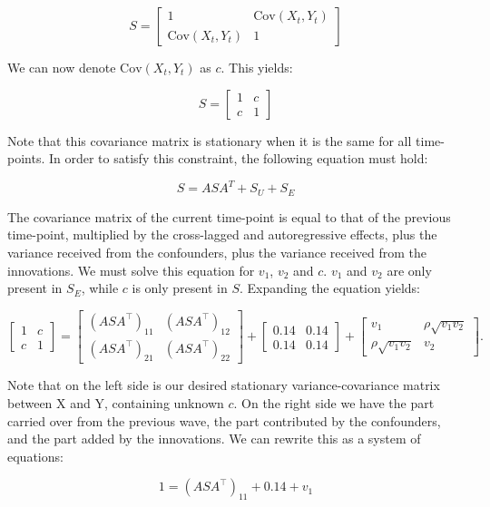\documentclass{article}
\begin{document}
\[
S =
\begin{bmatrix}
1 & \mathrm{Cov}(X_t, Y_t) \\
\mathrm{Cov}(X_t, Y_t) & 1
\end{bmatrix}
\]

\noindent
We can now denote $\mathrm{Cov}(X_t, Y_t)$ as $c$. This yields:

\[
S = \begin{bmatrix} 1 & c \\ c & 1 \end{bmatrix}
\]

\noindent
Note that this covariance matrix is stationary when it is the same for all time-points. In order to satisfy this constraint, the following equation must hold:

\[
S = A S A^T + S_U + S_E
\]

\noindent
The covariance matrix of the current time-point is equal to that of the previous time-point, multiplied by the cross-lagged and autoregressive effects, 
plus the variance received from the confounders, plus the variance received from the innovations. We must solve this equation for $v_1$, $v_2$ and $c$. 
$v_1$ and $v_2$ are only present in $S_E$, while $c$ is only present in $S$. Expanding the equation yields:

\[
\begin{bmatrix}
1 & c \\
c & 1
\end{bmatrix}
=
\begin{bmatrix}
(ASA^\top)_{11} & (ASA^\top)_{12} \\
(ASA^\top)_{21} & (ASA^\top)_{22}
\end{bmatrix}
+
\begin{bmatrix}
0.14 & 0.14 \\
0.14 & 0.14
\end{bmatrix}
+
\begin{bmatrix}
v_1 & \rho\sqrt{v_1 v_2} \\
\rho\sqrt{v_1 v_2} & v_2
\end{bmatrix}.
\]

\noindent
Note that on the left side is our desired stationary variance-covariance matrix between X and Y, containing unknown $c$. On the right 
side we have the part carried over from the previous wave, the part contributed by the confounders, and the part added by the 
innovations. We can rewrite this as a system of equations:

\[
1 = (ASA^\top)_{11} + 0.14 + v_1
\]
\end{document}
